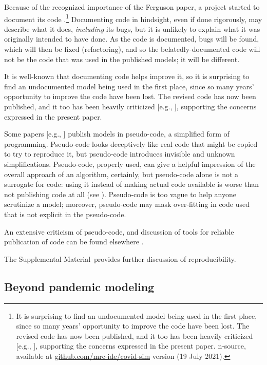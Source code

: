\documentclass{comjnl}
\def\supplement{Supplemental Material}
\def\citeeg#1{[e.g., \citenum{#1}]}
\begin{document}
Because of the recognized importance of the Ferguson paper, a project started to document its code  \cite{refactoring}.\footnote{It is surprising to find an undocumented model being used in the first place, since so many years' opportunity to improve the code have been lost. The revised code has now been published, and it too has been heavily criticized \citeeg{bad-code}, supporting the concerns expressed in the present paper.
n-source, available at \url{github.com/mrc-ide/covid-sim} version (19 July 2021).} Documenting code in hindsight, even if done rigorously, may describe what it does, \emph{including\/} its bugs, but it is unlikely to explain what it was originally intended to have done. As the code is documented, bugs will be found, which will then be fixed (refactoring), and so the belatedly-documented code will not be the code that was used in the published models; it will be different. 

It is well-known that documenting code helps improve it, so it is surprising to find an undocumented model being used in the first place, since so many years' opportunity to improve the code have been lost. The revised code has now been published, and it too has been heavily criticized \citeeg{bad-code}, supporting the concerns expressed in the present paper.

Some papers \citeeg{pseudo} publish models in pseudo-code, a simplified form of programming. Pseudo-code looks deceptively like real code that might be copied to try to reproduce it, but pseudo-code introduces invisible and unknown simplifications. Pseudo-code, properly used, can give a helpful impression of the overall approach of an algorithm, certainly, but pseudo-code alone is not a surrogate for code: using it instead of making actual code available is worse than not publishing code at all (see \cite{chinese}). Pseudo-code is too vague to help anyone scrutinize a model; moreover, pseudo-code may mask over-fitting in code used that is not explicit in the pseudo-code. 

An extensive criticism of pseudo-code, and discussion of tools for reliable publication of code can be found elsewhere \cite{relit}. 

The \supplement\ provides further discussion of reproducibility.

\subsection{Beyond pandemic modeling}
\label{section-science-beyond-pandemic-modeling}
\end{document}
